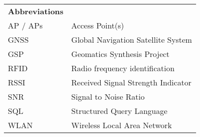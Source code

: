 \begin{table}[H]
\label{my-label}
\begin{tabular}{ll}
\textbf{Abbreviations} &                                    \\
AP / APs               & Access Point(s)                    \\
GNSS                   & Global Navigation Satellite System \\
GSP                    & Geomatics Synthesis Project        \\
RFID                   & Radio frequency identification     \\
RSSI                   & Received Signal Strength Indicator \\
SNR                    & Signal to Noise Ratio              \\
SQL                    & Structured Query Language          \\
WLAN                   & Wireless Local Area Network        \\
\end{tabular}
\end{table}
